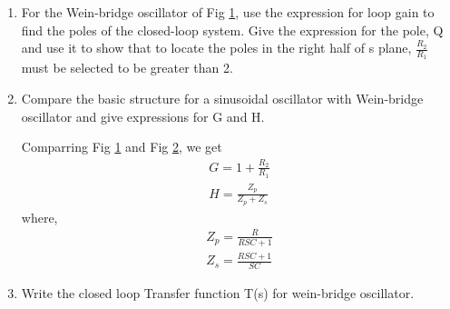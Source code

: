 \begin{enumerate}[label=\arabic*.,ref=\theenumi]

\item  For the Wein-bridge oscillator of Fig \ref{fig:ee18btech11044_3_tikz_1}, use the expression for loop gain to find the poles of the closed-loop system. Give the expression for the pole, Q and use it to show that to locate the poles in the right half of s plane, $\frac{R_2}{R_1}$ must be selected to be greater than 2. 
\renewcommand{\thefigure}{\theenumi.\arabic{figure}}
\begin{figure}[!hbt]
	\begin{center}
			\resizebox{\columnwidth}{!}{}
	\end{center}
\caption{}
\label{fig:ee18btech11044_3_tikz_1}
\end{figure}



\item Compare the basic structure for a sinusoidal oscillator with Wein-bridge oscillator and give expressions for G and H. 

\solution
\begin{itemize}
 Comparring Fig \ref{fig:ee18btech11044_3_tikz_1} and Fig \ref{fig:ee18btech11044_3_tikz_2}, we get
\begin{align}
G = 1+\frac{R_2}{R_1} \label{eq:ee18btech11044_3_1}\\
H = \frac{Z_p}{Z_p + Z_s}  \label{eq:ee18btech11044_3_2}
\end{align}
where,
\begin{align}
    Z_p = \frac{R}{RSC+1} \\
    Z_s = \frac{RSC+1}{SC}
\end{align}
\end{itemize}



\begin{figure}[!hbt]
	\begin{center}
		\resizebox{\columnwidth}{!}{}
	\end{center}
\caption{}
\label{fig:ee18btech11044_3_tikz_2}
\end{figure} 


\item Write the closed loop Transfer function T(s) for wein-bridge oscillator.


\end{enumerate}

